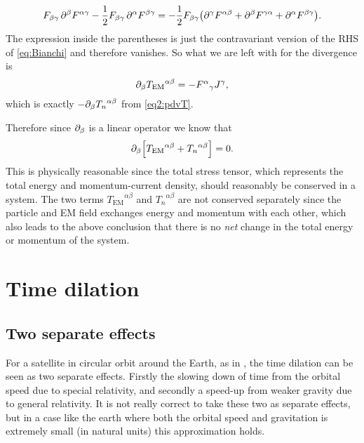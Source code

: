 \documentclass[11pt,a4paper, 
swedish, english %
]{article}
\newcommand{\EM}{\text{EM}}
\begin{document}
\begin{equation}
F_{\beta\gamma} \,\partial^\beta F^{\alpha\gamma}
-\frac{1}{2}F_{\beta\gamma}\,\partial^\alpha F^{\beta\gamma}=
-\frac{1}{2}F_{\beta\gamma}\qty( 
\partial^\gamma F^{\alpha\beta}
+\partial^\beta F^{\gamma\alpha}
+\partial^\alpha F^{\beta\gamma}).
\end{equation}
The expression inside the parentheses is just the contravariant version
of the RHS of \eqref{eq:Bianchi} and therefore vanishes.
So what we are left with for the divergence is
\begin{equation}
\pd_{\beta}{T_{\EM}}^{\alpha\beta}=-{F^{\alpha}}_\gamma J^\gamma,
\end{equation}
which is exactly $-\partial_\beta{T_n}^{\alpha\beta}$ from \eqref{eq2:pdvT}.

Therefore since $\partial_\beta$ is a linear operator we know that
\begin{equation}
\pd_{\beta}\qty[{T_{\EM}}^{\alpha\beta}+{T_n}^{\alpha\beta}]=0.
\end{equation}
This is physically reasonable since the total stress tensor, which
represents the total energy and momentum-current density, should
reasonably be conserved in a system. The two terms
${T_{\EM}}^{\alpha\beta}$ and ${T_n}^{\alpha\beta}$ are not conserved
separately since the particle and EM field exchanges energy and
momentum with each other, which also leads to the above conclusion
that there is no \emph{net} change in the total energy or momentum of
the system.





\renewcommand{\thesubsection}{\arabic{section} (\roman{subsection})}
\section{Time dilation}
\swapcommands{\phi}{\varphi}
\subsection{Two separate effects}
For a satellite in circular orbit around the Earth, as in
, the time dilation can be seen as two separate
effects. Firstly the slowing down of time from the orbital speed due
to special relativity, and secondly a speed-up from weaker gravity due
to general relativity. It is not really correct to take these two as
separate effects, but in a case like the earth where both the orbital
speed and gravitation is extremely small (in natural units) this
approximation holds.
\end{document}
